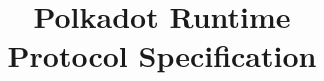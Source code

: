 \documentclass{book}
\begin{document}
\title{
  {\Huge Polkadot Runtime}\\
  {\Large Protocol Specification}
}

\date{}

\maketitle

{\tableofcontents}




\begin{appendix}
\end{appendix}
\end{document}

